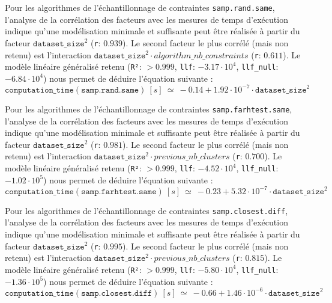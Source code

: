 			Pour les algorithmes de l'échantillonnage de contraintes \texttt{samp.rand.same}, l'analyse de la corrélation des facteurs avec les mesures de temps d'exécution indique qu'une modélisation minimale et suffisante peut être réalisée à partir du facteur $\texttt{dataset\_size}^{2}$ (\texttt{r}: $0.939$).
			Le second facteur le plus corrélé (mais non retenu) est l'interaction $\texttt{dataset\_size}^{2} \cdot algorithm\_nb\_constraints$ (\texttt{r}: $0.611$).
			Le modèle linéaire généralisé retenu (\texttt{R²}: $> 0.999$, \texttt{llf}: $-3.17 \cdot 10^{4}$, \texttt{llf\_null}: $-6.84 \cdot 10^{4}$) nous permet de déduire l'équation suivante :
			\begin{equation}
				\texttt{computation\_time}(\texttt{samp.rand.same})~[s]~
				\simeq~-0.14 + 1.92 \cdot 10^{-7} \cdot \texttt{dataset\_size}^{2}
			\end{equation}
			
			Pour les algorithmes de l'échantillonnage de contraintes \texttt{samp.farhtest.same}, l'analyse de la corrélation des facteurs avec les mesures de temps d'exécution indique qu'une modélisation minimale et suffisante peut être réalisée à partir du facteur $\texttt{dataset\_size}^{2}$ (\texttt{r}: $0.981$).
			Le second facteur le plus corrélé (mais non retenu) est l'interaction $\texttt{dataset\_size}^{2} \cdot previous\_nb\_clusters$ (\texttt{r}: $0.700$).
			Le modèle linéaire généralisé retenu (\texttt{R²}: $> 0.999$, \texttt{llf}: $-4.52 \cdot 10^{4}$, \texttt{llf\_null}: $-1.02 \cdot 10^{5}$) nous permet de déduire l'équation suivante :
			\begin{equation}
				\texttt{computation\_time}(\texttt{samp.farhtest.same})~[s]~
				\simeq~-0.23 + 5.32 \cdot 10^{-7} \cdot \texttt{dataset\_size}^{2}
			\end{equation}
			
			Pour les algorithmes de l'échantillonnage de contraintes \texttt{samp.closest.diff}, l'analyse de la corrélation des facteurs avec les mesures de temps d'exécution indique qu'une modélisation minimale et suffisante peut être réalisée à partir du facteur $\texttt{dataset\_size}^{2}$ (\texttt{r}: $0.995$).
			Le second facteur le plus corrélé (mais non retenu) est l'interaction $\texttt{dataset\_size}^{2} \cdot previous\_nb\_clusters$ (\texttt{r}: $0.815$).
			Le modèle linéaire généralisé retenu (\texttt{R²}: $> 0.999$, \texttt{llf}: $-5.80 \cdot 10^{4}$, \texttt{llf\_null}: $-1.36 \cdot 10^{5}$) nous permet de déduire l'équation suivante :
			\begin{equation}
				\texttt{computation\_time}(\texttt{samp.closest.diff})~[s]~
				\simeq~-0.66 + 1.46 \cdot 10^{-6} \cdot \texttt{dataset\_size}^{2}
			\end{equation}
			
